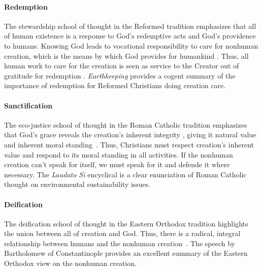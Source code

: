 \documentclass[12pt]{article}
\begin{document}
\paragraph{Redemption} 
\label{sec:redemption}

The stewardship school of thought in the Reformed tradition
emphasizes that all of human existence
is a response to God's redemptive acts
and God's providence to humans.
Knowing God leads to vocational responsibility 
to care for nonhuman creation,
which is the means by which God provides for humankind \autocite[19]{Jenkins:2008}. 
Thus, all human work to care for the creation 
is seen as service to the Creator
out of gratitude for redemption \autocite[77]{Jenkins:2008}.
\emph{Earthkeeping} \autocite{Wilkenson:1980aa} provides a cogent summary
of the importance of redemption for Reformed Christians doing creation care.

\paragraph{Sanctification} 
\label{sec:sanctification}

The eco-justice school of thought in the Roman Catholic tradition
emphasizes that God's grace reveals the creation's 
inherent integrity \autocite[19]{Jenkins:2008}, 
giving it natural value and inherent moral standing~\autocite{Joldersma:2019}. 
Thus, Christians must respect creation's inherent value and 
respond to its moral standing in all activities.
If the nonhuman creation can't speak for itself, 
we must speak for it and defende it where necessary.
The \emph{Laudato Si} encyclical \autocite{Pope-Francis:2015aa} 
is a clear enunciation of Roman Catholic thought
on environmental sustainability issues.

\paragraph{Deification} 
\label{sec:deification}

The deification school of thought in the Eastern Orthodox tradition
highlights the union between all of creation and God.
Thus, there is a radical, integral relationship between humans and 
the nonhuman creation~\autocite[93]{Jenkins:2008}.
The speech by Bartholomew of Constantinople 
\autocite[133-136]{Bartholomew-I-of-Constantinople:2011aa}
provides an excellent summary of the Eastern Orthodox view
on the nonhuman creation.
\end{document}
